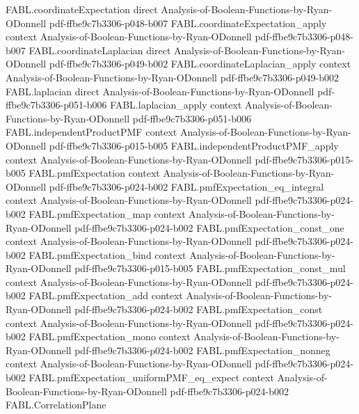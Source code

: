 \begin{theorem}
\proofstep
  {FABL.coordinateExpectation}
  {direct}
  {Analysis-of-Boolean-Functions-by-Ryan-ODonnell}
  {pdf-ffbe9c7b3306-p048-b007}
\proofstep
  {FABL.coordinateExpectation_apply}
  {context}
  {Analysis-of-Boolean-Functions-by-Ryan-ODonnell}
  {pdf-ffbe9c7b3306-p048-b007}
\proofstep
  {FABL.coordinateLaplacian}
  {direct}
  {Analysis-of-Boolean-Functions-by-Ryan-ODonnell}
  {pdf-ffbe9c7b3306-p049-b002}
\proofstep
  {FABL.coordinateLaplacian_apply}
  {context}
  {Analysis-of-Boolean-Functions-by-Ryan-ODonnell}
  {pdf-ffbe9c7b3306-p049-b002}
\proofstep
  {FABL.laplacian}
  {direct}
  {Analysis-of-Boolean-Functions-by-Ryan-ODonnell}
  {pdf-ffbe9c7b3306-p051-b006}
\proofstep
  {FABL.laplacian_apply}
  {context}
  {Analysis-of-Boolean-Functions-by-Ryan-ODonnell}
  {pdf-ffbe9c7b3306-p051-b006}
\proofstep
  {FABL.independentProductPMF}
  {context}
  {Analysis-of-Boolean-Functions-by-Ryan-ODonnell}
  {pdf-ffbe9c7b3306-p015-b005}
\proofstep
  {FABL.independentProductPMF_apply}
  {context}
  {Analysis-of-Boolean-Functions-by-Ryan-ODonnell}
  {pdf-ffbe9c7b3306-p015-b005}
\proofstep
  {FABL.pmfExpectation}
  {context}
  {Analysis-of-Boolean-Functions-by-Ryan-ODonnell}
  {pdf-ffbe9c7b3306-p024-b002}
\proofstep
  {FABL.pmfExpectation_eq_integral}
  {context}
  {Analysis-of-Boolean-Functions-by-Ryan-ODonnell}
  {pdf-ffbe9c7b3306-p024-b002}
\proofstep
  {FABL.pmfExpectation_map}
  {context}
  {Analysis-of-Boolean-Functions-by-Ryan-ODonnell}
  {pdf-ffbe9c7b3306-p024-b002}
\proofstep
  {FABL.pmfExpectation_const_one}
  {context}
  {Analysis-of-Boolean-Functions-by-Ryan-ODonnell}
  {pdf-ffbe9c7b3306-p024-b002}
\proofstep
  {FABL.pmfExpectation_bind}
  {context}
  {Analysis-of-Boolean-Functions-by-Ryan-ODonnell}
  {pdf-ffbe9c7b3306-p015-b005}
\proofstep
  {FABL.pmfExpectation_const_mul}
  {context}
  {Analysis-of-Boolean-Functions-by-Ryan-ODonnell}
  {pdf-ffbe9c7b3306-p024-b002}
\proofstep
  {FABL.pmfExpectation_add}
  {context}
  {Analysis-of-Boolean-Functions-by-Ryan-ODonnell}
  {pdf-ffbe9c7b3306-p024-b002}
\proofstep
  {FABL.pmfExpectation_const}
  {context}
  {Analysis-of-Boolean-Functions-by-Ryan-ODonnell}
  {pdf-ffbe9c7b3306-p024-b002}
\proofstep
  {FABL.pmfExpectation_mono}
  {context}
  {Analysis-of-Boolean-Functions-by-Ryan-ODonnell}
  {pdf-ffbe9c7b3306-p024-b002}
\proofstep
  {FABL.pmfExpectation_nonneg}
  {context}
  {Analysis-of-Boolean-Functions-by-Ryan-ODonnell}
  {pdf-ffbe9c7b3306-p024-b002}
\proofstep
  {FABL.pmfExpectation_uniformPMF_eq_expect}
  {context}
  {Analysis-of-Boolean-Functions-by-Ryan-ODonnell}
  {pdf-ffbe9c7b3306-p024-b002}
\proofstep
  {FABL.CorrelationPlane}

\end{theorem}
